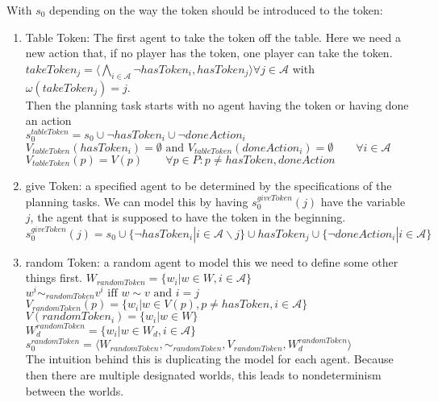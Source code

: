 With $s_0$ depending on the way the token should be introduced to the token:
\begin{enumerate}
  \item Table Token:
    The first agent to take the token off the table. Here we need a new action that, if no player has the token, one player can take the token.\\
    $takeToken_j=\langle \bigwedge\limits_{i \in \mathcal{A}}
    \neg hasToken_i, hasToken_j \rangle \forall j \in \mathcal{A}$ with $\omega(takeToken_j)=j$. \\
    Then the planning task starts with no agent having the token or having done an action \\
    $s_0^{tableToken} = s_0 \cup \neg hasToken_i \cup \neg doneAction_i$ \\
    $V_{tableToken}(hasToken_i)=\emptyset \text{ and } V_{tableToken}(doneAction_i)=\emptyset \qquad \forall i\in \mathcal{A}$\\
    $V_{tableToken}(p)=V(p) \qquad \forall p\in P : p \not = hasToken, doneAction$

  \item give Token:
    a specified agent to be determined by the specifications of the planning tasks. We can model this by having $s_0^{giveToken}(j)$ have the variable $j$, the agent that is supposed to have the token in the beginning. \\
     $s_0^{giveToken}(j) = s_0 \cup \{\neg hasToken_i|i \in \mathcal{A} \backslash j\} \cup hasToken_j \cup \{\neg doneAction_i|i \in \mathcal{A}\}$

  \item random Token:
    a random agent
    to model this we need to define some other things first.
    $W_{randomToken}=\{w_i|w \in W, i\in \mathcal{A}\}$ \\
    $w^i \sim_{randomToken} v^i \text{ iff } w \sim v \text{ and } i=j$ \\
    $V_{randomToken}(p)=\{w_i|w\in V(p), p \not = hasToken, i\in \mathcal{A}\}$ \\
    $V(randomToken_i)=\{w_i|w \in W\}$ \\
    $W^{randomToken}_d=\{w_i|w\in W_d, i\in \mathcal{A}\}$ \\
    $s_0^{randomToken}=\langle W_{randomToken}, \sim_{randomToken}, V_{randomToken}, W^{randomToken}_d \rangle$ \\
    The intuition behind this is duplicating the model for each agent. Because then there are multiple designated worlds, this leads to nondeterminism between the worlds.
\end{enumerate}



